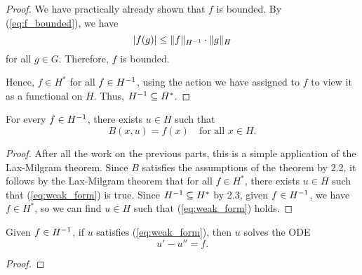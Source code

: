 \documentclass{homework}
\begin{document}
\begin{arabicparts}
\begin{proof}
			We have practically already shown that $f$ is bounded. By (\ref{eq:f_bounded}), we have
			\begin{equation}
				|f(g)| \le \lVert f\rVert_{H^{-1}}\cdot\lVert g\rVert_H
			\end{equation}
			for all $g \in G$. Therefore, $f$ is bounded.
			
			Hence, $f \in H^*$ for all $f \in {H^{-1}}$, using the action we have assigned to $f$ to view it as a functional on $H$. Thus, ${H^{-1}} \subseteq H^*$.
		\end{proof}
		
		\questionpart
		For every $f \in {H^{-1}}$, there exists $u \in H$ such that
		\begin{equation}
			\label{eq:weak_form}
			B(x,u) = f(x) \quad\text{for all } x\in H.
		\end{equation}
		
		\begin{proof}
			After all the work on the previous parts, this is a simple application of the Lax-Milgram theorem. Since $B$ satisfies the assumptions of the theorem by 2.2, it follows by the Lax-Milgram theorem that for all $f \in H^*$, there exists $u \in H$ such that (\ref{eq:weak_form}) is true. Since ${H^{-1}} \subseteq H^*$ by 2.3, given $f \in {H^{-1}}$, we have $f \in H^*$, so we can find $u\in H$ such that (\ref{eq:weak_form}) holds.
		\end{proof}
		
		\questionpart
		Given $f \in {H^{-1}}$, if $u$ satisfies (\ref{eq:weak_form}), then $u$ solves the ODE
		\begin{equation}
			u' -u'' = f.
		\end{equation}
		\begin{proof}
			
		\end{proof}
	\end{arabicparts}
\end{document}
